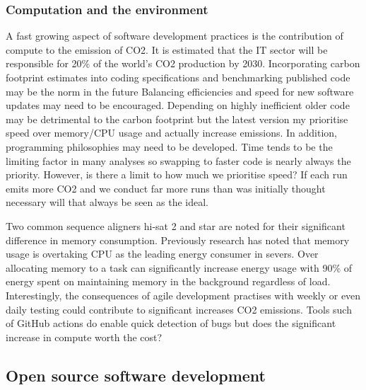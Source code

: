 \documentclass{SBCbookchapter}
\begin{document}
\subsubsection{Computation and the environment}

A fast growing aspect of software development practices is the contribution of compute to the emission of CO2.
It is estimated that the IT sector will be responsible for 20\% of the world's CO2 production by 2030. 
Incorporating carbon footprint estimates into coding specifications and benchmarking published code may be the norm in the future
Balancing efficiencies and speed for new software updates may need to be encouraged.
Depending on highly inefficient older code may be detrimental to the carbon footprint but the latest version my prioritise speed over memory/CPU usage and actually increase emissions.
In addition, programming philosophies may need to be developed. 
Time tends to be the limiting factor in many analyses so swapping to faster code is nearly always the priority. 
However, is there a limit to how much we prioritise speed? 
If each run emits more CO2 and we conduct far more runs than was initially thought necessary will that always be seen as the ideal.

Two common sequence aligners hi-sat 2 and star are noted for their significant difference in memory consumption.
Previously research has noted that memory usage is overtaking CPU as the leading energy consumer in severs.
Over allocating memory to a task can significantly increase energy usage with 90\% of energy spent on maintaining memory in the background regardless of load.
Interestingly, the consequences of agile development practises with weekly or even daily testing could contribute to significant increases CO2 emissions.
Tools such of GitHub actions do enable quick detection of bugs but does the significant increase in compute worth the cost?



\subsection{Open source software development}
\end{document}
